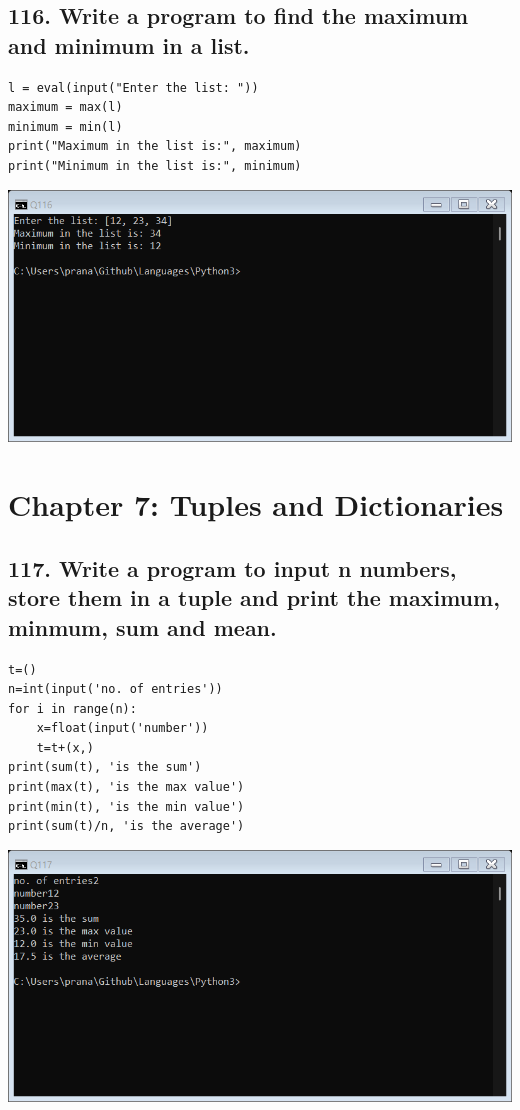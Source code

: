 \documentclass[12pt]{article}
\begin{document}
\subsection*{116. Write a program to find the maximum and minimum in a list.}
\begin{verbatim}
l = eval(input("Enter the list: "))
maximum = max(l)
minimum = min(l)
print("Maximum in the list is:", maximum)
print("Minimum in the list is:", minimum)
\end{verbatim}
\includegraphics[width=\linewidth]{images/116.png}


\section*{Chapter 7: Tuples and Dictionaries}

\subsection*{117. Write a program to input n numbers, store them in a tuple and print the maximum, minmum, sum and mean.}
\begin{verbatim}
t=()
n=int(input('no. of entries'))
for i in range(n):
    x=float(input('number'))
    t=t+(x,)
print(sum(t), 'is the sum')
print(max(t), 'is the max value')
print(min(t), 'is the min value')
print(sum(t)/n, 'is the average')
\end{verbatim}
\includegraphics[width=\linewidth]{images/117.png}
\end{document}
